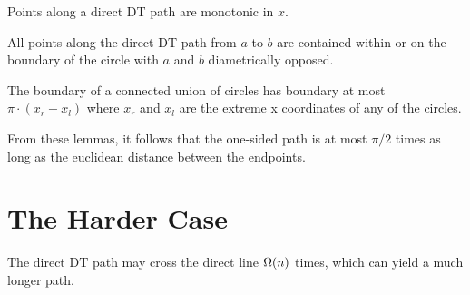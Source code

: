 \documentclass{tufte-handout}
\begin{document}

\begin{Lemma}

  Points along a direct DT path are monotonic in $x$.

\end{Lemma}

\begin{Lemma}

  All points along the direct DT path from $a$ to $b$ are contained
  within or on the boundary of the circle with $a$ and $b$
  diametrically opposed.
  
\end{Lemma}

\begin{Lemma}

  The boundary of a connected union of circles has boundary at most
  $\pi \cdot (x_r - x_l)$ where $x_r$ and $x_l$ are the extreme x
  coordinates of any of the circles.
  
\end{Lemma}

From these lemmas, it follows that the one-sided path is at most
$\pi/2$ times as long as the euclidean distance between the endpoints.

\section{The Harder Case}

The direct DT path may cross the direct line $\Omega\!\left(n\right)$ times,
which can yield a much longer path.
\end{document}
